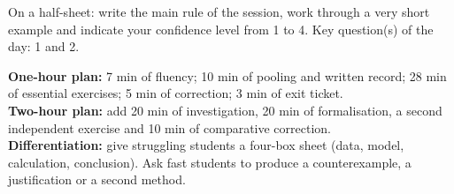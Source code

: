 \begin{sortie}On a half-sheet: write the main rule of the session, work through a very short example and indicate your confidence level from 1 to 4. Key question(s) of the day: 1 and 2.\end{sortie}

\ifprof
\begin{methode}
\textbf{One-hour plan:} 7 min of fluency; 10 min of pooling and written record; 28 min of essential exercises; 5 min of correction; 3 min of exit ticket.\\
\textbf{Two-hour plan:} add 20 min of investigation, 20 min of formalisation, a second independent exercise and 10 min of comparative correction.\\
\textbf{Differentiation:} give struggling students a four-box sheet (data, model, calculation, conclusion). Ask fast students to produce a counterexample, a justification or a second method.
\end{methode}
\fi

